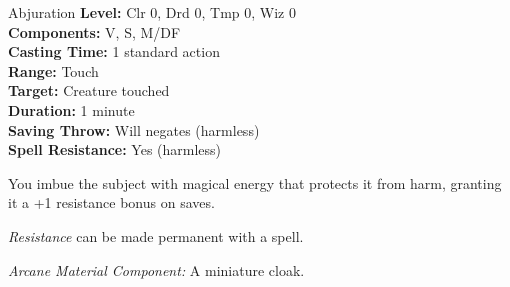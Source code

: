 {Abjuration}
{
	\textbf{Level:}
	Clr 0, Drd 0, Tmp 0, Wiz 0\\
	\textbf{Components:}
	V, S, M/DF\\
	\textbf{Casting Time:}
	1 standard action\\
	\textbf{Range:}
	Touch\\
	\textbf{Target:}
	Creature touched\\
	\textbf{Duration:}
	1 minute\\
	\textbf{Saving Throw:}
	Will negates (harmless)\\
	\textbf{Spell Resistance:}
	Yes (harmless)\\
}
{
	You imbue the subject with magical energy that protects it from harm, granting it a +1 resistance bonus on saves.

	\emph{Resistance} can be made permanent with a  spell.

	\textit{Arcane Material Component:}
	A miniature cloak.

}
